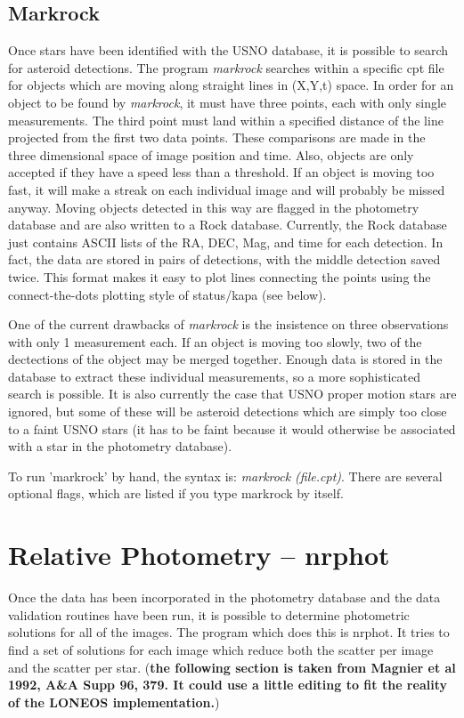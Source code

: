 \documentclass{article}
\newcommand{\note}[1]{({\bf #1})}
\newcommand\pr{\em}                   %
\newcommand\ty{\sc}                   %
\begin{document}
\subsection{Markrock}

Once stars have been identified with the USNO database, it is possible
to search for asteroid detections.  The program {\pr markrock}
searches within a specific {\ty cpt} file for objects which are moving along
straight lines in (X,Y,t) space.  In order for an object to be found
by {\pr markrock}, it must have three points, each with only single
measurements.  The third point must land within a specified distance
of the line projected from the first two data points.  These
comparisons are made in the three dimensional space of image position
and time.  Also, objects are only accepted if they have a speed less
than a threshold.  If an object is moving too fast, it will make a
streak on each individual image and will probably be missed anyway.
Moving objects detected in this way are flagged in the photometry
database and are also written to a Rock database.  Currently, the Rock
database just contains ASCII lists of the RA, DEC, Mag, and time for
each detection.  In fact, the data are stored in pairs of detections,
with the middle detection saved twice.  This format makes it easy to
plot lines connecting the points using the connect-the-dots plotting
style of status/kapa (see below).

One of the current drawbacks of {\pr markrock} is the insistence on
three observations with only 1 measurement each.  If an object is
moving too slowly, two of the dectections of the object may be merged
together.  Enough data is stored in the database to extract these
individual measurements, so a more sophisticated search is possible.
It is also currently the case that USNO proper motion stars are
ignored, but some of these will be asteroid detections which are
simply too close to a faint USNO stars (it has to be faint because it
would otherwise be associated with a star in the photometry
database).  

To run 'markrock' by hand, the syntax is: {\pr markrock (file.cpt)}.
There are several optional flags, which are listed if you type
markrock by itself.

\section{Relative Photometry -- nrphot}

Once the data has been incorporated in the photometry database and the
data validation routines have been run, it is possible to determine
photometric solutions for all of the images.  The program which does
this is nrphot.  It tries to find a set of solutions for each image
which reduce both the scatter per image and the scatter per star.
\note{the following section is taken from Magnier et al
1992, A\&A Supp 96, 379.  It could use a little editing to fit the
reality of the LONEOS implementation.}
\end{document}
